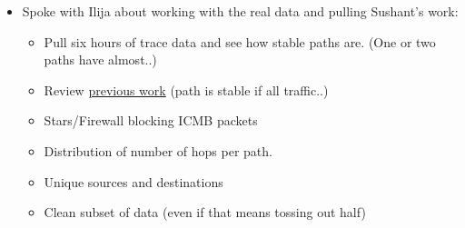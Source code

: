 \documentclass{weeklyreport}
\begin{document}
\begin{itemize}
    \item Spoke with Ilija about working with the real data and pulling Sushant's work:
    \begin{itemize}
		\item Pull six hours of trace data and see how stable paths are. (One or two paths have almost..)
		\item Review \href{https://github.com/sand-ci/Analytics}{previous work} (path is stable if all traffic..)
		\item Stars/Firewall blocking ICMB packets
		\item Distribution of number of hops per path.
		\item Unique sources and destinations
		\item Clean subset of data (even if that means tossing out half)
	\end{itemize}
\end{itemize}


\subsection*{}
\end{document}
